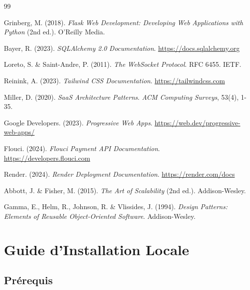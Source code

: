 \documentclass[12pt,a4paper]{report}
\begin{document}
\cleardoublepage
\begin{thebibliography}{99}

Grinberg, M. (2018). \textit{Flask Web Development: Developing Web Applications with Python} (2nd ed.). O'Reilly Media.

Bayer, R. (2023). \textit{SQLAlchemy 2.0 Documentation}. \url{https://docs.sqlalchemy.org}

Loreto, S. \& Saint-Andre, P. (2011). \textit{The WebSocket Protocol}. RFC 6455. IETF.

Reinink, A. (2023). \textit{Tailwind CSS Documentation}. \url{https://tailwindcss.com}

Miller, D. (2020). \textit{SaaS Architecture Patterns}. \textit{ACM Computing Surveys}, 53(4), 1-35.

Google Developers. (2023). \textit{Progressive Web Apps}. \url{https://web.dev/progressive-web-apps/}

Flouci. (2024). \textit{Flouci Payment API Documentation}. \url{https://developers.flouci.com}

Render. (2024). \textit{Render Deployment Documentation}. \url{https://render.com/docs}

Abbott, J. \& Fisher, M. (2015). \textit{The Art of Scalability} (2nd ed.). Addison-Wesley.

Gamma, E., Helm, R., Johnson, R. \& Vlissides, J. (1994). \textit{Design Patterns: Elements of Reusable Object-Oriented Software}. Addison-Wesley.

\end{thebibliography}

\cleardoublepage
\appendix
\chapter{Guide d'Installation Locale}

\section{Prérequis}
\end{document}
